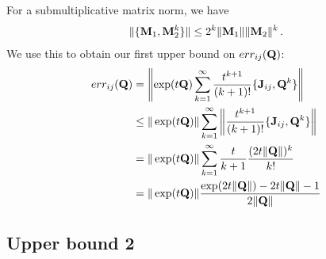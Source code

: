 \documentclass[12pt]{article} %
\begin{document}
For a submultiplicative matrix norm, we have
\begin{align*}
	\Vert \{\mathbf{M}_1, \mathbf{M}_2^k \}  \Vert \leq 2^k \Vert \mathbf{M}_1\Vert \Vert\mathbf{M}_2 \Vert ^k \, .
\end{align*}
We use this to obtain our first upper bound on $err_{ij}(\mathbf{Q})$:
\begin{align*}
	err_{ij}(\mathbf{Q}) &= \left\Vert \exp(t\mathbf{Q})  \sum_{k=1}^\infty \frac{t^{k+1}}{(k+1)!} \{\mathbf{J}_{ij},\mathbf{Q}^k\} \right\Vert  \\
	&\leq \Vert \exp(t\mathbf{Q}) \Vert \sum_{k=1}^\infty \left\Vert \frac{t^{k+1}}{(k+1)!} \{\mathbf{J}_{ij},\mathbf{Q}^k\} \right\Vert  \\
	&=  \Vert \exp(t\mathbf{Q}) \Vert \sum_{k=1}^\infty \frac{t}{k+1} \frac{(2t \Vert \mathbf{Q} \Vert)^k}{k!}\\
	&= \Vert \exp(t\mathbf{Q}) \Vert   \frac{\exp(2t\Vert \mathbf{Q} \Vert)-2t\Vert\mathbf{Q}\Vert-1}{2\Vert \mathbf{Q} \Vert} 
\end{align*}


\subsection{Upper bound 2}
\end{document}
